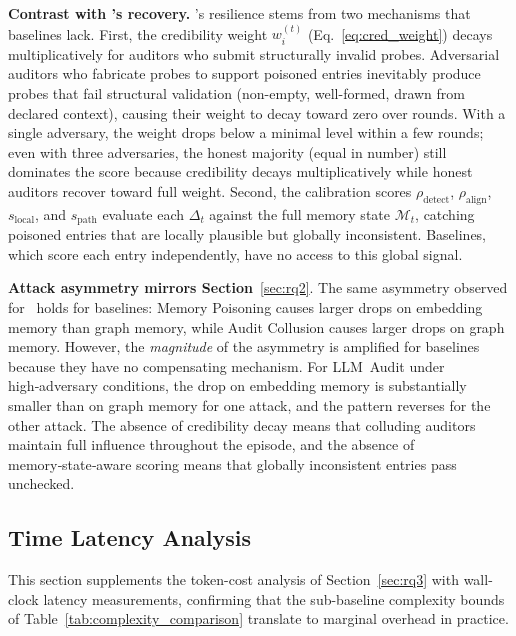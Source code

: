 \textbf{Contrast with \system's recovery.}
\system's resilience stems from two mechanisms that
baselines lack.  First, the credibility weight
$w_i^{(t)}$ (Eq.~\ref{eq:cred_weight}) decays
multiplicatively for auditors who submit structurally
invalid probes.  Adversarial auditors who fabricate
probes to support poisoned entries inevitably produce
probes that fail structural validation (non-empty,
well-formed, drawn from declared context), causing
their weight to decay toward zero over rounds.  With
a single adversary, the weight drops below a minimal
level within a few rounds; even with three
adversaries, the honest majority (equal in number)
still dominates the score because credibility decays
multiplicatively while honest auditors recover toward
full weight.  Second, the calibration scores
$\rho_{\text{detect}}$, $\rho_{\text{align}}$,
$s_{\text{local}}$, and $s_{\text{path}}$ evaluate
each $\Delta_t$ against the full memory state
$\mathcal{M}_t$, catching poisoned entries that are
locally plausible but globally inconsistent.
Baselines, which score each entry independently,
have no access to this global signal.

\textbf{Attack asymmetry mirrors Section}~\ref{sec:rq2}.
The same asymmetry observed for \system\ holds for
baselines: Memory Poisoning causes larger drops on
embedding memory than graph memory, while Audit
Collusion causes larger drops on graph memory.
However, the \emph{magnitude} of the asymmetry is
amplified for baselines because they have no
compensating mechanism.  For LLM~Audit under
high‑adversary conditions, the drop on embedding
memory is substantially smaller than on graph memory
for one attack, and the pattern reverses for the
other attack.  The absence of credibility decay
means that colluding auditors maintain full
influence throughout the episode, and the absence of
memory‑state‑aware scoring means that globally
inconsistent entries pass unchecked.

\subsection{Time Latency Analysis}
\label{app:latency}

This section supplements the token-cost analysis
of Section~\ref{sec:rq3} with wall-clock latency
measurements, confirming that the sub-baseline
complexity bounds of Table~\ref{tab:complexity_comparison}
translate to marginal overhead in practice.

